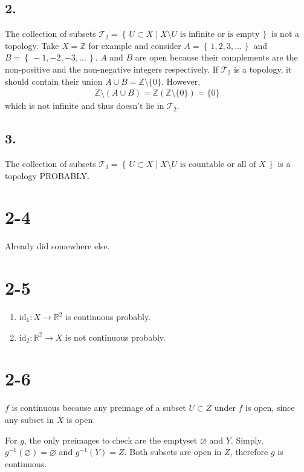 \documentclass[a4paper]{book}
\theoremstyle{definition}
\newcommand{\set}[1]{\left\{\, #1 \,\right\}}
\newcommand{\makeset}[2]{\left\{\, #1 \mid #2 \,\right\}}
\begin{document}
\subsection*{2.}
The collection of subsets \(\mathcal{T}_2 = \makeset{U \subset X}{X \setminus U \text{ is infinite or is empty}}\) is not a topology. Take \(X = \mathbb{Z}\) for example and consider \(A = \set{1, 2, 3, \ldots}\) and \(B = \set{-1, -2, -3, \ldots}\). \(A\) and \(B\) are open because their complements are the non-positive and the non-negative integers respectively. If \(\mathcal{T}_2\) is a topology, it should contain their union \(A \cup B = \mathbb{Z} \setminus \{0\}\). However,
\begin{align*}
    \mathbb{Z} \setminus (A \cup B) = \mathbb{Z} (\mathbb{Z} \setminus \{0\}) = \{0\}
\end{align*}
which is not infinite and thus doesn't lie in \(\mathcal{T}_2\).

\subsection*{3.}
The collection of subsets \(\mathcal{T}_3 = \makeset{U \subset X}{X \setminus U \text{ is countable or all of } X}\) is a topology PROBABLY.

\section*{2-4}

Already did somewhere else.

\section*{2-5}
\begin{enumerate}
    \item \(\mathrm{id}_1: X \longrightarrow \mathbb{R}^2\) is continuous probably.
    \item \(\mathrm{id}_2: \mathbb{R}^2 \longrightarrow X\) is not continuous probably.
\end{enumerate}

\section*{2-6}
\(f\) is continuous because any preimage of a subset \(U \subset Z\) under \(f\) is open, since any subset in \(X\) is open.

For \(g\), the only preimages to check are the emptyset \(\varnothing\) and \(Y\). Simply, \(g^{-1}(\varnothing) = \varnothing\) and \(g^{-1}(Y) = Z\). Both subsets are open in \(Z\), therefore \(g\) is continuous.
\end{document}
